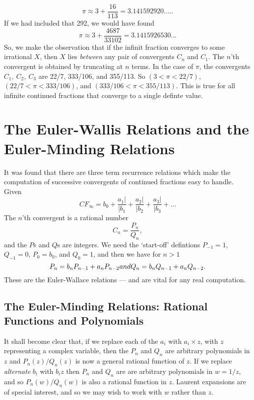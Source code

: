 \documentclass[16pt]{article}
\numberwithin{equation}{section}
\numberwithin{figure}{section}
\numberwithin{figure}{section}
\numberwithin{equation}{section}
\begin{document}
\begin{equation}
\pi \approx 3+\frac{16}{113}=3.141592920.....
\end{equation}
If we had included that 292, we would have found
\begin{equation}
\pi \approx 3+\frac{4687}{33102}=3.1415926530...
\end{equation}
So, we make the observation that if the infinit fraction converges to
some irrational $X$, then $X$ lies {\em between} any pair of convergents $C_n$
and $C_1$. The $n$'th convergent is obtained by truncating at $n$ terms.
In the case of $\pi$, the convergents $C_1,\>C_2,\>C_3$ are
22/7, 333/106, and 355/113. So $(3 < \pi < 22/7)$, $(22/7 < \pi < 333/106)$,
and $(333/106 < \pi < 355/113)$. This is true for all infinite continued fractions
that converge to a single definte value.

\section{The Euler-Wallis Relations and the Euler-Minding Relations}

It was found that there are three term recurrence relations which make the computation of
successive convergents of continued fractions easy to handle. Given
\begin{equation}
CF_{\infty}=b_0 +\frac{a_1 \vert}{\vert b_1}+\frac{a_2 \vert}{\vert b_2}
+\frac{a_3 \vert}{\vert b_3}+\ldots
\end{equation}
The $n$'th convergent is a rational number
\begin{equation}
C_n=\frac{P_n}{Q_n},
\end{equation}
and the $P$s and $Q$s are integers.
We need the `start-off' defintions $P_{-1}=1$, $Q_{-1}=0$, $P_0=b_0$, and $Q_0=1$,
 and then we have for $n>1$
\begin{equation}
P_n=b_n P_{n-1}+a_n P_{n-2}
$$ and  $$
Q_n=b_n Q_{n-1}+a_n Q_{n-2}.
\end{equation}
These are the Euler-Wallace relations --- and are vital for any real computation.

\subsection{The Euler-Minding Relations: Rational Functions and Polynomials}


It shall become clear that, if we replace each of the $a_i$ with $a_i \times z$, with $z$ representing
 a complex variable, then the $P_n$ and $Q_n$ are arbitrary polynomials in $z$ and $P_n(z)/Q_n(z)$
is now a general rational function of $z$. If we replace 
{\em alternate} $b_i$ with $b_i z$ then $P_n$ and $Q_n$ are  are arbitrary polynomials in $w=1/z$,
and so $P_n(w)/Q_n(w)$ is also a rational function in $z$. Laurent expansions are of special interest,
 and so we may wish to work with $w$ rather than $z$.
\end{document}
